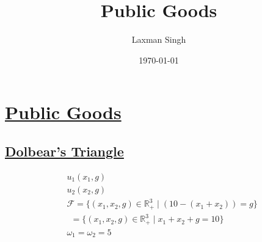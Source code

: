 \documentclass[12pt,a4paper,fleqn]{article}
\author{Laxman Singh}
\date{\today}
\title{Public Goods}
\begin{document}
\section{\underline{Public Goods}}
\subsection{\underline{Dolbear's Triangle}}
 \begin{align*}
  &u_{1}(x_{1}, g)\\
  &u_{2}(x_{2},g)\\
  &\mathcal{F}=\{(x_{1},x_{2},g) \in \mathbb{R}^3_{+} \mid \left( 10-(x_{1}+x_{2}) \right) = g\}  \\
  & \ \ =\{(x_{1},x_{2},g)\in \mathbb{R}^3_{+} \mid x_{1}+x_{2}+g=10\} \\
  &\omega_{1}=\omega_{2}=5\
 \end{align*} 
\end{document}
